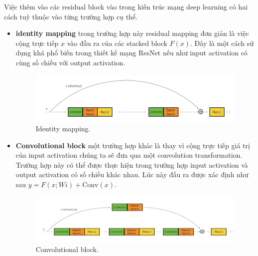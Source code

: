 Việc thêm vào các residual block vào trong kiến trúc mạng deep learning có hai cách tuỳ thuộc vào từng trường hợp cụ thể.
\begin{itemize}
	\item {\bf identity mapping} trong trường hợp này residual mapping đơn giản là việc cộng trực tiếp $x$ vào đầu ra của các stacked block $F(x)$. Đây là một cách sử dụng khá phổ biến trong thiết kế mạng ResNet nếu như input activation có cùng số chiều với output activation.
	\begin{figure}[H]
		\centering
		\includegraphics[width=1\linewidth]{images/resnet_identity_mapping}
		\caption{Identity mapping.}
		\label{fig:resnet_identity_mapping}
	\end{figure}
	\item {\bf Convolutional block} một trường hợp khác là thay vì cộng trực tiếp giá trị của input activation chúng ta sẽ đưa qua một convolution transformation. Trường hợp này có thể được thực hiện trong trường hợp input activation và output activation có số chiều khác nhau. Lúc này đầu ra được xác định như sau $y=F(x;Wi)+\text{Conv}(x)$.
	\begin{figure}[H]
		\centering
		\includegraphics[width=1\linewidth]{images/resnet_conv_block}
		\caption{Convolutional block.}
		\label{fig:resnet_conv_block}
	\end{figure}
\end{itemize}
